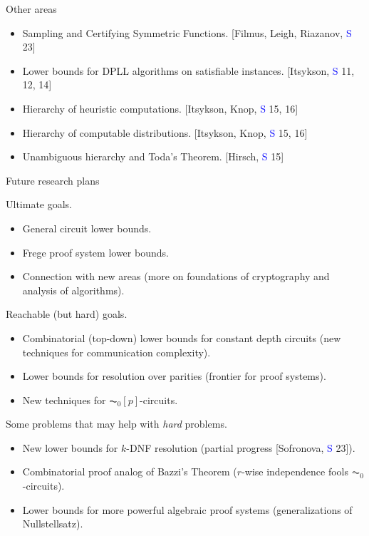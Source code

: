 \begin{frame}{Other areas}

    \begin{itemize}
        \item Sampling and Certifying Symmetric Functions. [Filmus, Leigh, Riazanov, \textcolor{blue}{S} 23]
        \item Lower bounds for DPLL algorithms on satisfiable instances. [Itsykson, \textcolor{blue}{S} 11, 12, 14]
        \item Hierarchy of heuristic computations. [Itsykson, Knop, \textcolor{blue}{S} 15, 16]
        \item Hierarchy of computable distributions. [Itsykson, Knop, \textcolor{blue}{S} 15, 16]
        \item Unambiguous hierarchy and Toda's Theorem. [Hirsch, \textcolor{blue}{S} 15]
    \end{itemize}
    
\end{frame}


\begin{frame}{Future research plans}

    Ultimate goals.
    \begin{itemize}
        \item General circuit lower bounds.
        \item Frege proof system lower bounds.
        \item Connection with new areas (more on foundations of cryptography and analysis of algorithms).
    \end{itemize}

    \pause
    Reachable (but hard) goals.
    \begin{itemize}
        \item Combinatorial (top-down) lower bounds for constant depth circuits (new techniques for
            communication complexity).
        \item Lower bounds for resolution over parities (frontier for proof systems).
        \item New techniques for $\AC_0[p]$-circuits.
    \end{itemize}

    \pause 
    Some problems that may help with \emph{hard} problems.
    \begin{itemize}
        \item New lower bounds for $k$-DNF resolution (partial progress [Sofronova, \textcolor{blue}{S} 23]).
        \item Combinatorial proof analog of Bazzi's Theorem ($r$-wise independence fools
            $\AC_0$-circuits).
        \item Lower bounds for more powerful algebraic proof systems (generalizations of Nullstellsatz).
    \end{itemize}
    
\end{frame}


